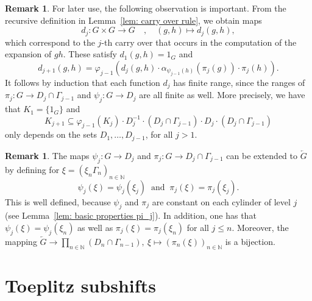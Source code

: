 \documentclass[titlepage,reqno,10pt]{amsart}
\theoremstyle{definition}
\newtheorem{remark}[theorem]{Remark}
\def\N{{\mathbb N}}
\begin{document}
\begin{remark}\label{rem: carry-over maps} For later use, the following observation is important. 
From the recursive definition in Lemma~\ref{lem: carry over rule}, we obtain maps
$$ d_j: G\times G\to G \quad , \quad (g,h)\mapsto d_j(g,h),$$
 which correspond to the $j$-th carry over that occurs in the computation of the expansion of $gh$.  These satisfy $d_1(g,h) = 1_G$ and
$$
d_{j+1}(g,h)=\varphi_{j-1}\left(d_{j}(g,h)\cdot \alpha_{\psi_{j-1}(h)}(\pi_j(g)) \cdot \pi_j(h)\right).
$$
It follows by induction that each function $d_j$ has finite range, since the ranges of $\pi_j:G\to D_j\cap \Gamma_{j-1}$ and $\psi_j:G\to D_j$ are all finite as well. More precisely, %
we have that $K_1=\{1_G\}$ and 
$$ K_{j+1}\subseteq \varphi_{j-1}(K_j)\cdot D_j^{-1}\cdot(D_j\cap \Gamma_{j-1})\cdot D_j\cdot (D_j\cap \Gamma_{j-1})$$
only depends on the sets $D_1,\ldots,D_{j-1}$,
for all $j>1$. 
\end{remark}

\begin{remark}\label{rem: extension of psi_j and pi_j}
    The maps $\psi_j: G\to D_j$ and $\pi_j:G\to D_j\cap\Gamma_{j-1}$ can be extended to $\overleftarrow{G}$ by defining for $\xi=(\xi_n\Gamma_n)_{n\in\N}$
    $$ \psi_j(\xi) = \psi_j(\xi_j)\:\text{ and }\: \pi_j(\xi) = \pi_j(\xi_j).$$
    This is well defined, because $\psi_j$ and $\pi_j$ are constant on each cylinder of level $j$  (see Lemma~\ref{lem: basic properties pi_j}). In addition, one has that $\psi_j(\xi) = \psi_j(\xi_n)$ as well as $\pi_j(\xi) = \pi_j(\xi_n)$ for all $j\leq n$.
    Moreover, the mapping $\overleftarrow{G}\to \prod_{n\in\N} (D_n\cap\Gamma_{n-1}),\: \xi\mapsto(\pi_n(\xi))_{n\in\N}$ is a bijection.
 \end{remark}       

 



\section{Toeplitz subshifts}\label{sec: Toeplitz}
 

\end{document}
